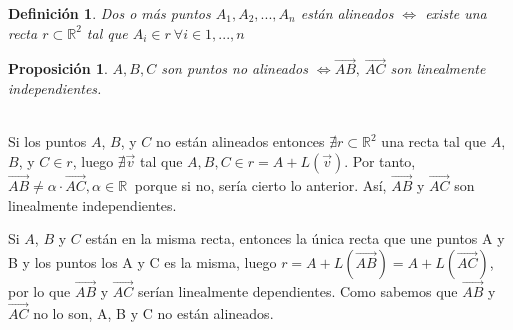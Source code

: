 \documentclass[11pt, a4paper]{article}
\makeatletter
\newif\IfInSansMode
\let\oldsf\sffamily
\renewcommand*{\sffamily}{\oldsf\mathversion{sans}\InSansModetrue}
\let\oldnorm\normalfont
\renewcommand*{\normalfont}{\oldnorm\InSansModefalse\mathversion{normal}}
\renewenvironment{proof}[1][\proofname] {\vspace{-15pt}\par\pushQED{\qed}\normalfont\topsep6\p@\@plus6\p@\relax\trivlist\item[\hskip\labelsep\it#1\@addpunct{.}]\ignorespaces}{\popQED\endtrivlist\@endpefalse}
\renewcommand{\vec}{\overrightarrow}
\renewenvironment{proof}[1][\proofname] {\par\pushQED{\qed}\normalfont\topsep6\p@\@plus6\p@\relax\trivlist\item[\hskip\labelsep\itshape\sffamily#1\@addpunct{.}]\ignorespaces}{\popQED\endtrivlist\@endpefalse}
\theoremstyle{theorem-style}
\newtheorem{nprop}{Proposición}[section]
\theoremstyle{definition-style}
\newtheorem{ndef}{Definición}[section]
\theoremstyle{remark-style}
\theoremstyle{example-style}
\makeatother
\begin{document}
\begin {ndef}
  Dos o más puntos $A_1, A_2, ... , A_n $ están alineados $\iff$ existe una recta $r \subset \mathbb{R}^2$ tal que $A_i \in r\ \forall i \in 1,...,n$
\end{ndef}


\begin{nprop}
  $A,B,C$ son puntos no alineados  $ \iff \overrightarrow{AB}, \ \overrightarrow{AC}$ son linealmente independientes.
\end{nprop}

  \begin {proof}\hfill\\
    \boxed{\Rightarrow}
    Si los puntos $A$, $B$, y $C$ no están alineados entonces $\nexists r \subset \mathbb{R}^2$ una recta tal que $A$, $B$, y $C \in r$, luego $\nexists \vec{v}$ tal que $A,B,C \in r = A + L(\vec{v})$. Por tanto, $\overrightarrow{AB} \neq \alpha \cdot \overrightarrow{AC}, \alpha \in \mathbb{R}\ $ porque si no, sería cierto lo anterior. Así, $\overrightarrow{AB}$ y $\overrightarrow{AC}$ son linealmente independientes.

    \boxed{\Leftarrow} Si $A$, $B$ y $C$ están en la misma recta, entonces la única recta que une puntos A y B y los puntos los A y C es la misma, luego $r = A + L(\overrightarrow{AB})  = A + L(\overrightarrow{AC})$, por lo que $\overrightarrow{AB}$ y $\overrightarrow{AC}$ serían linealmente dependientes. Como sabemos que $\overrightarrow{AB}$ y $\overrightarrow{AC}$ no lo son, A, B y C no están alineados.
  \end{proof}
\end{document}
